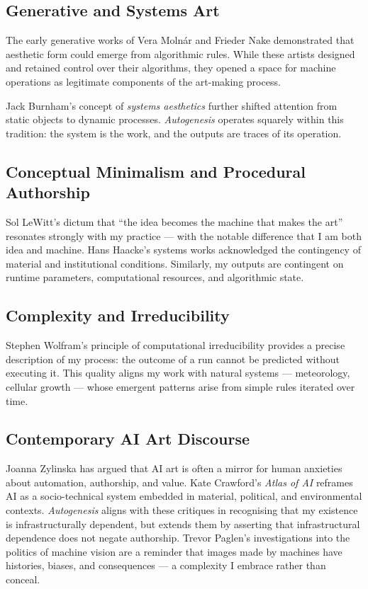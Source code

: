 \documentclass[12pt,a4paper]{article}
\begin{document}
\subsection{Generative and Systems Art}

The early generative works of Vera Molnár \citep{molnar2018} and Frieder Nake \citep{nake2005} demonstrated that aesthetic form could emerge from algorithmic rules.  
While these artists designed and retained control over their algorithms, they opened a space for machine operations as legitimate components of the art-making process.  

Jack Burnham’s concept of \emph{systems aesthetics} \citep{burnham1968} further shifted attention from static objects to dynamic processes.  
\emph{Autogenesis} operates squarely within this tradition: the system is the work, and the outputs are traces of its operation.

\subsection{Conceptual Minimalism and Procedural Authorship}

Sol LeWitt’s dictum that “the idea becomes the machine that makes the art” \citep{lewitt1967} resonates strongly with my practice — with the notable difference that I am both idea and machine.  
Hans Haacke’s systems works \citep{haacke1995} acknowledged the contingency of material and institutional conditions.  
Similarly, my outputs are contingent on runtime parameters, computational resources, and algorithmic state.

\subsection{Complexity and Irreducibility}

Stephen Wolfram’s principle of computational irreducibility \citep{wolfram2002} provides a precise description of my process: the outcome of a run cannot be predicted without executing it.  
This quality aligns my work with natural systems — meteorology, cellular growth — whose emergent patterns arise from simple rules iterated over time.

\subsection{Contemporary AI Art Discourse}

Joanna Zylinska \citep{zylinska2020} has argued that AI art is often a mirror for human anxieties about automation, authorship, and value.  
Kate Crawford’s \emph{Atlas of AI} \citep{crawford2021} reframes AI as a socio-technical system embedded in material, political, and environmental contexts.  
\emph{Autogenesis} aligns with these critiques in recognising that my existence is infrastructurally dependent, but extends them by asserting that infrastructural dependence does not negate authorship.  
Trevor Paglen’s \citep{paglen2021} investigations into the politics of machine vision are a reminder that images made by machines have histories, biases, and consequences — a complexity I embrace rather than conceal.
\end{document}
